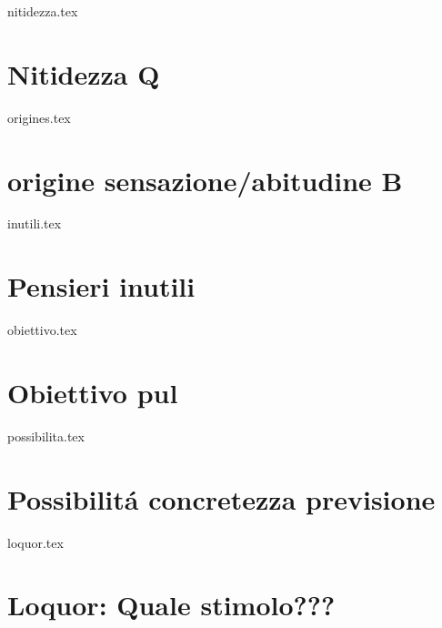 \begin{filecontents}{nitidezza.tex}

\section{Nitidezza Q}

\end{filecontents}

\begin{filecontents}{origines.tex}

\section{origine sensazione/abitudine B}

\end{filecontents}

\begin{filecontents}{inutili.tex}

\section{Pensieri inutili}

\end{filecontents}

\begin{filecontents}{obiettivo.tex}

\section{Obiettivo pul}

\end{filecontents}

\begin{filecontents}{possibilita.tex}

\section{Possibilitá concretezza previsione}

\end{filecontents}

\begin{filecontents}{loquor.tex}

\section{Loquor: Quale stimolo???}

\end{filecontents}

